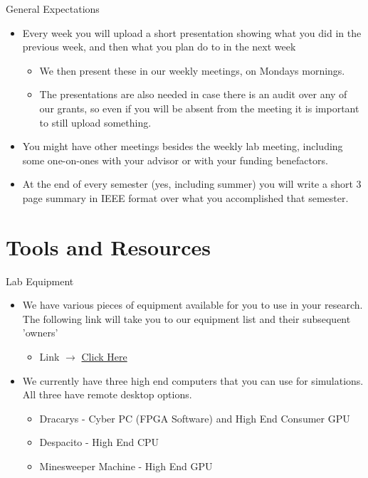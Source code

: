\documentclass[handout]{beamer}
\begin{document}
\begin{frame}{General Expectations}
\begin{itemize}
  \item Every week you will upload a short presentation showing what you did in the previous week, and then what you plan do to in the next week 
  \begin{itemize}
      \item We then present these in our weekly meetings, on Mondays mornings. 
      \item The presentations are also needed in case there is an audit over any of our grants, so even if you will be absent from the meeting it is important to still upload something.
  \end{itemize}
  \item You might have other meetings besides the weekly lab meeting, including some one-on-ones with your advisor or with your funding benefactors.
  \item At the end of every semester (yes, including summer) you will write a short 3 page summary in IEEE format over what you accomplished that semester. 
\end{itemize}
\end{frame}

\section{Tools and Resources}
\begin{frame}{Lab Equipment}
\begin{itemize}
  \item We have various pieces of equipment available for you to use in your research. The following link will take you to our equipment list and their subsequent 'owners'
  \begin{itemize}
      \item Link $\rightarrow$ \href{https://mailuc-my.sharepoint.com/:x:/g/personal/jones2a5_mail_uc_edu/EXBe2QP-OvxGii-G5BHZC_cBd0Yh-bm_f038cyp-A_TBMQ?e=vjvvBS}{Click Here}
  \end{itemize}
  \item We currently have three high end computers that you can use for simulations. All three have remote desktop options.
  \begin{itemize}
      \item Dracarys - Cyber PC (FPGA Software) and High End Consumer GPU
      \item Despacito - High End CPU
      \item Minesweeper Machine - High End GPU 
  \end{itemize}
\end{itemize}
\end{frame}
\end{document}
